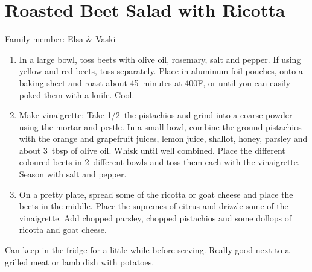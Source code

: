 \chapter{Roasted Beet Salad with Ricotta}
\label{ch:roasted-beet-salad}


Family member: Elsa \& Vaski

\begin{enumerate}
    \item In a large bowl, toss beets with olive oil, rosemary, salt and pepper. If using yellow and red beets, toss separately. Place in aluminum foil pouches, onto a baking sheet and roast about 45~minutes at 400\degree F, or until you can easily poked them with a knife. Cool.
    \item Make vinaigrette: Take 1/2~the pistachios and grind into a coarse powder using the mortar and pestle. In a small bowl, combine the ground pistachios with the orange and grapefruit juices, lemon juice, shallot, honey, parsley and about 3~tbsp of olive oil. Whisk until well combined. Place the different coloured beets in 2~different bowls and toss them each with the vinaigrette. Season with salt and pepper.
    \item On a pretty plate, spread some of the ricotta or goat cheese and place the beets in the middle. Place the supremes of citrus and drizzle some of the vinaigrette. Add chopped parsley, chopped pistachios and some dollops of ricotta and goat cheese.
\end{enumerate}

Can keep in the fridge for a little while before serving.
Really good next to a grilled meat or lamb dish with potatoes.

